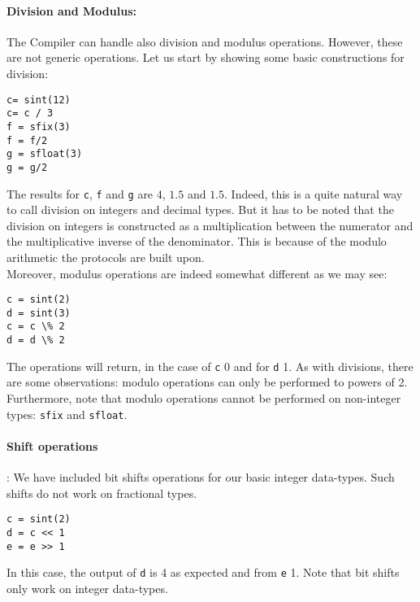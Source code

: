 \paragraph{Division and Modulus:}
The Compiler can handle also division and modulus operations. 
However, these are not generic operations. 
Let us start by showing some basic constructions for division: 
\begin{lstlisting}
c= sint(12)
c= c / 3
f = sfix(3)
f = f/2	
g = sfloat(3)
g = g/2	
\end{lstlisting}
The results for \verb|c|, \verb|f| and \verb|g| are $4$, $1.5$ and $1.5$. 
Indeed, this is a quite natural way to call division on integers and decimal types. 
But it has to be noted that the division on integers is constructed as a multiplication 
between the numerator and the multiplicative inverse of the denominator. 
This is because of the modulo arithmetic the protocols are built upon. 
\\ 
Moreover,  modulus operations are indeed somewhat different as we may see: 
\begin{lstlisting}
c = sint(2)
d = sint(3)
c = c \% 2
d = d \% 2
\end{lstlisting}
The operations will return, in the case of \verb|c| 0 and for \verb|d| 1. 
As with divisions, there are some observations: 
modulo operations can only be performed to powers of 2. 
Furthermore, note that modulo operations cannot be performed 
on non-integer types: \verb|sfix| and \verb|sfloat|.
\\
\paragraph{Shift operations}:
We have included bit shifts operations for our basic integer data-types. 
Such shifts do not work on fractional types. 
\begin{lstlisting}
c = sint(2)
d = c << 1
e = e >> 1 
\end{lstlisting}
In this case, the output of \verb|d| is 4 as expected and from \verb|e| 1. 
Note that bit shifts only work on integer data-types.
\\
